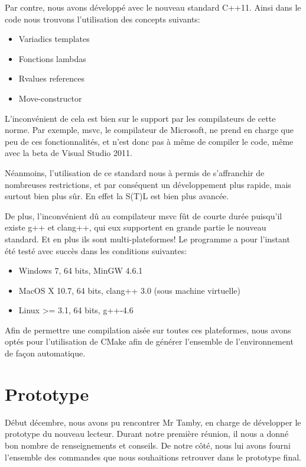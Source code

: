 Par contre, nous avons développé avec le nouveau standard C++11. Ainsi
dans le code nous trouvons l'utilisation des concepts suivants:

    \begin{itemize}
    \item Variadics templates
    \item Fonctions lambdas
    \item Rvalues references
    \item Move-constructor
    \end{itemize}

L'inconvénient de cela est bien sur le support par les compilateurs de cette
norme. Par exemple, msvc, le compilateur de Microsoft, ne prend en charge que peu
de ces fonctionnalités, et n'est donc pas à même de compiler le code, même avec la
beta de Visual Studio 2011.

Néanmoins, l'utilisation de ce standard nous à permis de s'affranchir de nombreuses
restrictions, et par conséquent un développement plus rapide, mais surtout bien
plus sûr. En effet la S(T)L est bien plus avancée.

De plus, l'inconvénient dû au compilateur msvc fût de courte durée puisqu'il
existe g++ et clang++, qui eux supportent en grande partie le nouveau standard.
Et en plus ils sont multi-plateformes! Le programme a pour l'instant été testé 
avec succès dans les conditions suivantes:

    \begin{itemize}
    \item Windows 7, 64 bits, MinGW 4.6.1
    \item MacOS X 10.7, 64 bits, clang++ 3.0 (sous machine virtuelle)
    \item Linux >= 3.1, 64 bits, g++-4.6
    \end{itemize}

Afin de permettre une compilation aisée sur toutes ces plateformes, nous avons
optés pour l'utilisation de CMake afin de générer l'ensemble de l'environnement de
façon automatique.


    \section{Prototype}
Début décembre, nous avons pu rencontrer Mr Tamby, en charge de développer le
prototype du nouveau lecteur. Durant notre première réunion, il nous a donné
bon nombre de renseignements et conseils. De notre côté, nous lui avons fourni
l'ensemble des commandes que nous souhaitions retrouver dans le prototype final.

